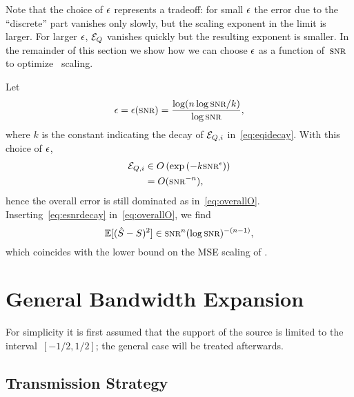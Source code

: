 Note that the choice of $\epsilon$ represents a tradeoff: for small $\epsilon$ the error due
to the ``discrete'' part vanishes only slowly, but the scaling exponent in the
limit is larger. For larger $\epsilon$, ${{\mathcal{E}}_Q}$ vanishes quickly but the resulting
exponent is smaller. In the remainder of this section we show how we can choose
$\epsilon$ as a function of~$\snr$ to optimize \sdr\ scaling. 

Let
\begin{equation}
  \label{eq:esnrdecay}
  \e = \e(\snr) = \frac{\log(n \log\snr / k)}{\log\snr},
\end{equation}
where $k$ is the constant indicating the decay of ${{\mathcal{E}}_{Q,i}}$ in~\eqref{eq:eqidecay}.
With this choice of $\epsilon$,
\begin{align*}
  \Eqi &\in O\left( \exp\left( - k \snr^\e \right) \right) \\
 &= O(\snr^{-n}),
\end{align*}
hence the overall error is still dominated as in~\eqref{eq:overallO}.
Inserting~\eqref{eq:esnrdecay} in~\eqref{eq:overallO}, we find
\begin{equation*}
  \mse \in \snr^n (\log\snr)^{-(n-1)},
\end{equation*}
which coincides with the lower bound on the MSE scaling of .





\section{General Bandwidth Expansion}\label{sec:genbwexp}

For simplicity it is first assumed that the support of the source is limited to
the interval~$[-1/2, 1/2]$; the general case will be treated afterwards.

\subsection{Transmission Strategy}

